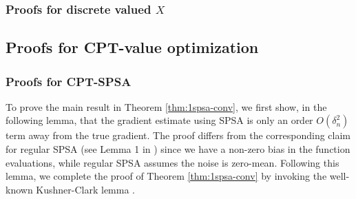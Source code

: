 \subsubsection{Proofs for discrete valued $X$}
\label{sec:proofs-discrete}


\subsection{Proofs for CPT-value optimization}
\subsubsection{Proofs for CPT-SPSA}
\label{appendix:1spsa}

To prove the main result in Theorem \ref{thm:1spsa-conv}, we first show, in the following lemma, that the gradient estimate using SPSA is only an order $O(\delta_n^2)$ term away from the true gradient. The proof differs from the corresponding claim for regular SPSA (see Lemma 1 in \cite{spall}) since we have a non-zero bias in the function evaluations, while regular SPSA assumes the noise is zero-mean. Following this lemma, we complete the proof of Theorem \ref{thm:1spsa-conv} by invoking the well-known Kushner-Clark lemma \cite{kushner-clark}.

